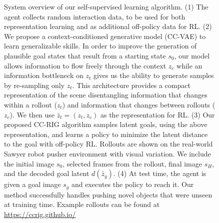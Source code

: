 \begin{figure}
    \caption{System overview of our self-supervised learning algorithm.
    (1) The agent collects random interaction data, to be used for both representation learning and as additional off-policy data for RL.
    (2) We propose a context-conditioned generative model (CC-VAE) to learn generalizable skills.
    In order to improve the generation of plausible goal states that result from a starting state $s_0$, our model allows information to flow freely through the context $z_c$ while an information bottleneck on $z_t$ gives us the ability to generate samples by re-sampling only $z_t$.
    This architecture provides a compact representation of the scene disentangling information that changes within a rollout ($z_t$) and information that changes between rollouts ($z_c$).
    We then use $\bar{z}_t = (z_t, z_c)$ as the representation for RL.
    (3) Our proposed CC-RIG algorithm samples latent goals, using the above representation, and learns a policy to minimize the latent distance to the goal with off-policy RL.
    Rollouts are shown on the real-world Sawyer robot pusher environment with visual variation.
    We include the initial image $s_0$, selected frames from the rollout, final image $s_H$, and the decoded goal latent $d(\bar{z}_g)$.
    (4) At test time, the agent is given a goal image $s_g$ and executes the policy to reach it. Our method successfully handles pushing novel objects that were unseen at training time. Example rollouts can be found at  \url{https://ccrig.github.io/}}
    \label{fig:fig1}
\end{figure}

